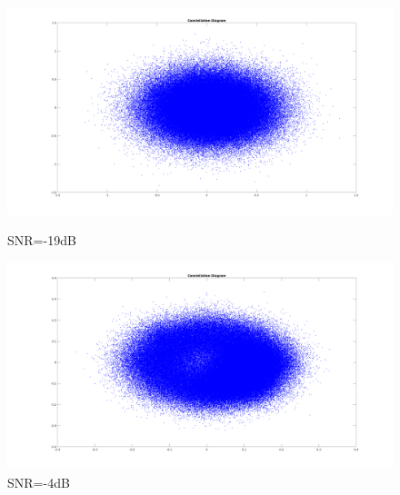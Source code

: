 \begin{spacing}{1.5}
\begin{figure}[H]
\begin{minipage}[t]{0.5\linewidth}
\centering
\includegraphics[width=0.9\columnwidth]{constellation1.png}
\caption{SNR=-19dB}
\end{minipage}
\hfill
\begin{minipage}[t]{0.5\linewidth}
\centering
\includegraphics[width=0.9\columnwidth]{constellation2.png}
\caption{SNR=-4dB}
\end{minipage}
\end{figure}



\end{spacing}
